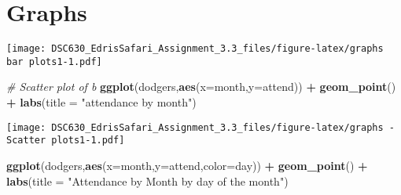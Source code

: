 \documentclass[
]{article}
\newenvironment{Shaded}{\begin{snugshade}}{\end{snugshade}}
\newcommand{\CommentTok}[1]{\textcolor[rgb]{0.56,0.35,0.01}{\textit{#1}}}
\newcommand{\DataTypeTok}[1]{\textcolor[rgb]{0.13,0.29,0.53}{#1}}
\newcommand{\KeywordTok}[1]{\textcolor[rgb]{0.13,0.29,0.53}{\textbf{#1}}}
\newcommand{\NormalTok}[1]{#1}
\newcommand{\OperatorTok}[1]{\textcolor[rgb]{0.81,0.36,0.00}{\textbf{#1}}}
\newcommand{\StringTok}[1]{\textcolor[rgb]{0.31,0.60,0.02}{#1}}
\begin{document}
\hypertarget{graphs}{%
\section{Graphs}\label{graphs}}

\begin{Shaded}
\end{Shaded}

\texttt{[image: DSC630\_EdrisSafari\_Assignment\_3.3\_files/figure-latex/graphs bar plots1-1.pdf]}

\begin{Shaded}
\begin{Highlighting}[]
\CommentTok{# Scatter plot of b}
\KeywordTok{ggplot}\NormalTok{(dodgers,}\KeywordTok{aes}\NormalTok{(}\DataTypeTok{x=}\NormalTok{month,}\DataTypeTok{y=}\NormalTok{attend)) }\OperatorTok{+}
\StringTok{  }\KeywordTok{geom_point}\NormalTok{() }\OperatorTok{+}
\StringTok{  }\KeywordTok{labs}\NormalTok{(}\DataTypeTok{title =} \StringTok{"attendance by month"}\NormalTok{)}
\end{Highlighting}
\end{Shaded}

\texttt{[image: DSC630\_EdrisSafari\_Assignment\_3.3\_files/figure-latex/graphs - Scatter plots1-1.pdf]}

\begin{Shaded}
\begin{Highlighting}[]
\KeywordTok{ggplot}\NormalTok{(dodgers,}\KeywordTok{aes}\NormalTok{(}\DataTypeTok{x=}\NormalTok{month,}\DataTypeTok{y=}\NormalTok{attend,}\DataTypeTok{color=}\NormalTok{day)) }\OperatorTok{+}
\StringTok{  }\KeywordTok{geom_point}\NormalTok{() }\OperatorTok{+}\StringTok{ }
\StringTok{  }\KeywordTok{labs}\NormalTok{(}\DataTypeTok{title =} \StringTok{"Attendance by Month by day of the month"}\NormalTok{)}
\end{Highlighting}
\end{Shaded}
\end{document}
